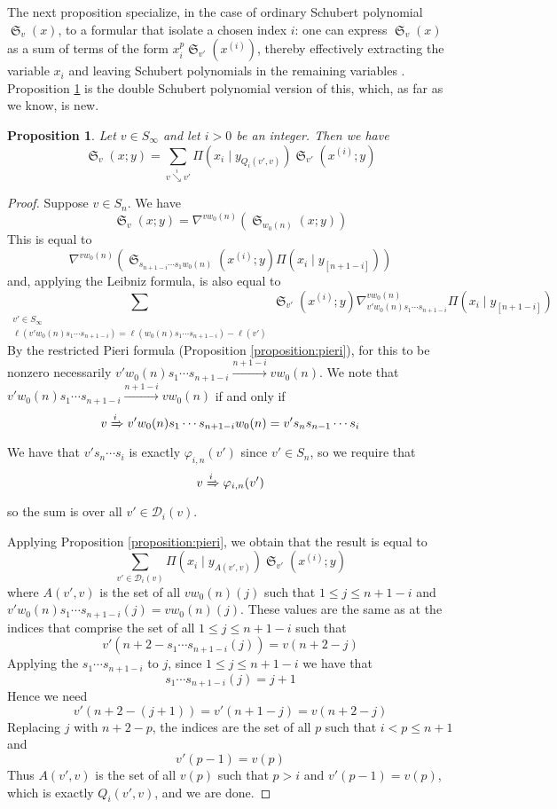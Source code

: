 \documentclass{amsart}
\newtheorem{proposition}[lemma]{Proposition}
\theoremstyle{definition}
\theoremstyle{remark}
\numberwithin{equation}{subsection}
\DeclareMathOperator{\sch}{\mathfrak{S}}
\newcommand{\tom}[1]{\xrightarrow{#1}}
\newcommand{\Tom}[1]{\xRightarrow{#1}}
\newcommand{\smpfu}{\mathsf{\Pi}}
\newcommand{\smpr}[3]{\ensuremath{}\smpfu\left( #1 \mid #2_{[#3]}\right)}
\newcommand{\smpre}[2]{\ensuremath{}\smpfu\left( #1 \mid #2\right)}
\newcommand{\downvar}[1]{\stackrel{#1}{\searrow}}
\begin{document}
The next proposition specialize, in the case of ordinary Schubert polynomial $\sch_v(x)$, to a formular that isolate a chosen index $i$: one can express $\sch_v(x)$ as a sum of terms of the form $x_i^p\sch_{v'}(x^{(i)})$, thereby effectively extracting the variable $x_i$ and leaving Schubert polynomials in the remaining variables \cite[Theorem~5.1]{bsskew}. Proposition \ref{proposition:pullindex} is the double Schubert polynomial version of this, which, as far as we know, is new.%


\begin{proposition} \label{proposition:pullindex}
Let $v\in S_\infty$ and let $i>0$ be an integer. Then we have
$$\sch_v(x;y)=\sum_{v\downvar{i} v'}\smpre{x_i}{y_{Q_i(v',v)}}\sch_{v'}(x^{(i)};y)$$
\end{proposition}
\begin{proof}
Suppose $v\in S_n$. We have
$$\sch_v(x;y)=\nabla^{vw_0(n)}(\sch_{w_0(n)}(x;y))$$
This is equal to
$$\nabla^{vw_0(n)}(\sch_{s_{n+1-i}\cdots s_1w_0(n)}(x^{(i)};y)\smpr{x_i}{y}{n+1-i})$$
and, applying the Leibniz formula, is also equal to
$$\sum_{\substack{v'\in S_\infty\\\ell(v'w_0(n)s_1\cdots s_{n+1-i})=\ell(w_0(n)s_1\cdots s_{n+1-i})-\ell(v')}}\sch_{v'}(x^{(i)};y)\nabla_{v'w_0(n)s_1\cdots s_{n+1-i}}^{vw_0(n)}\smpr{x_i}{y}{n+1-i}$$
By the restricted Pieri formula (Proposition \ref{proposition:pieri}), for this to be nonzero necessarily $v'w_0(n)s_1\cdots s_{n+1-i}\tom{n+1-i}vw_0(n)$. We note that $v'w_0(n)s_1\cdots s_{n+1-i}\tom{n+1-i}vw_0(n)$ if and only if 
$$v\Tom{i}v'w_0(n)s_1\cdots s_{n+1-i}w_0(n)=v's_ns_{n-1}\cdots s_i$$
We have that $v's_n\cdots s_i$ is exactly $\varphi_{i,n}(v')$ since $v'\in S_n$, so we require that
$$v\Tom{i}\varphi_{i,n}(v')$$
so the sum is over all $v'\in \mathcal{D}_i(v)$.

Applying Proposition \ref{proposition:pieri}, we obtain that the result is equal to
$$\sum_{v'\in \mathcal{D}_i(v)} \smpre{x_i}{y_{A(v',v)}}\sch_{v'}(x^{(i)};y)$$
where $A(v',v)$ is the set of all $vw_0(n)(j)$ such that $1\leq j\leq n+1-i$ and $v'w_0(n)s_1\cdots s_{n+1-i}(j)=vw_0(n)(j)$. These values are the same as at the indices that comprise the set of all $1\leq j\leq n+1-i$ such that
$$v'(n+2-s_1\cdots s_{n+1-i}(j))=v(n+2-j)$$
Applying the $s_1\cdots s_{n+1-i}$ to $j$, since $1\leq j\leq n+1-i$ we have that 
$$s_1\cdots s_{n+1-i}(j)=j+1$$
Hence we need
$$v'(n+2-(j+1))=v'(n+1-j)=v(n+2-j)$$
Replacing $j$ with $n+2-p$, the indices are the set of all $p$ such that $i<p\leq n+1$ and
$$v'(p-1)=v(p)$$
Thus $A(v',v)$ is the set of all $v(p)$ such that $p>i$ and $v'(p-1)=v(p)$, which is exactly $Q_i(v',v)$, and we are done.
\end{proof}
\end{document}
